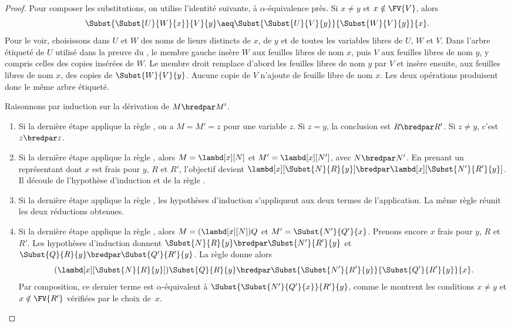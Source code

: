 \documentclass[../../../include/open-logic-section]{subfiles}
\begin{document}
\begin{proof}
Pour composer les substitutions, on utilise
l'identité suivante, à $\alpha$-équivalence près.
Si $x\neq y$ et $x\notin\FV{V}$, alors
\[
  \Subst{\Subst{U}{W}{x}}{V}{y}
  \aeq
  \Subst{\Subst{U}{V}{y}}{\Subst{W}{V}{y}}{x}.
\]
Pour le voir, choisissons dans $U$ et $W$ des noms de
lieurs distincts de $x$, de $y$ et de toutes les variables
libres de $U$, $W$ et $V$. Dans l'arbre étiqueté de $U$
utilisé dans la preuve du ,
le membre gauche insère $W$ aux feuilles libres de nom $x$,
puis $V$ aux feuilles libres de nom $y$, y compris celles
des copies insérées de $W$. Le membre droit remplace
d'abord les feuilles libres de nom $y$ par $V$ et insère
ensuite, aux feuilles libres de nom $x$, des copies de
$\Subst{W}{V}{y}$. Aucune copie de $V$ n'ajoute de feuille
libre de nom $x$. Les deux opérations produisent donc le
même arbre étiqueté.

Raisonnons par induction sur la dérivation
de $M \bredpar M'$.
\begin{enumerate}
\item Si la dernière étape applique la règle
  , on a $M=M'=z$ pour une
  variable $z$. Si $z=y$, la conclusion est
  $R\bredpar R'$. Si $z\neq y$, c'est
  $z\bredpar z$.
\item Si la dernière étape applique la règle
  , alors
  $M=\lambd[x][N]$ et
  $M'=\lambd[x][N']$, avec
  $N\bredpar N'$. En prenant un représentant
  dont $x$ est frais pour $y$, $R$ et $R'$,
  l'objectif devient
  $\lambd[x][\Subst{N}{R}{y}]
  \bredpar
  \lambd[x][\Subst{N'}{R'}{y}]$.
  Il découle de l'hypothèse d'induction
  et de la règle .
\item Si la dernière étape applique la règle
  , les hypothèses d'induction
  s'appliquent aux deux termes de l'application.
  La même règle réunit les deux réductions obtenues.
\item Si la dernière étape applique la règle
  , alors
  $M=(\lambd[x][N])Q$ et
  $M'=\Subst{N'}{Q'}{x}$.
  Prenons encore $x$ frais pour $y$, $R$
  et $R'$. Les hypothèses d'induction
  donnent
  $\Subst{N}{R}{y}\bredpar
  \Subst{N'}{R'}{y}$ et
  $\Subst{Q}{R}{y}\bredpar
  \Subst{Q'}{R'}{y}$.
  La règle  donne
  alors
  \[
    (\lambd[x][\Subst{N}{R}{y}])
    \Subst{Q}{R}{y}
    \bredpar
    \Subst{\Subst{N'}{R'}{y}}
          {\Subst{Q'}{R'}{y}}{x}.
  \]
  Par composition, ce dernier terme est
  $\alpha$-équivalent à
  $\Subst{\Subst{N'}{Q'}{x}}{R'}{y}$,
  comme le montrent les conditions $x\neq y$
  et $x\notin\FV{R'}$ vérifiées par le choix de~$x$.
\end{enumerate}
\end{proof}
\end{document}
